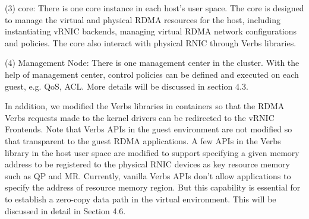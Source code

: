 (3) \sys core: There is one \sys core instance in each host's user space. The \sys core is designed to manage the virtual and physical RDMA resources for the host, including instantiating vRNIC backends, managing virtual RDMA network configurations and policies. The \sys core also interact with physical RNIC through Verbs libraries.


(4) Management Node: There is one management center in the cluster. With the help of management center, control policies can be defined and executed on each guest, e.g. QoS, ACL. More details will be discussed in section 4.3.


In addition,  we modified the Verbs libraries in containers so that the RDMA Verbs requests made to the kernel drivers can be redirected to the vRNIC Frontends. Note that Verbs APIs in the guest environment are not modified so that \sys transparent to the guest RDMA applications. A few APIs in the Verbs library in the host user space are modified to support specifying a given memory address to be registered to the physical RNIC devices as key resource memory such as QP and MR. Currently, vanilla Verbs APIs don't allow applications to specify the address of resource memory region. But this capability is essential for \sys to establish a zero-copy data path in the virtual environment. This will be discussed in detail in Section 4.6.